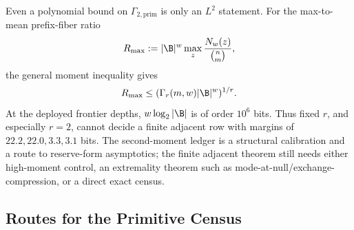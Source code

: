\begin{remark}
\label{rem:gf-sp-moment-barrier}
Even a polynomial bound on \(\Gamma_{2,\mathrm{prim}}\) is only an \(L^2\)
statement.  For the max-to-mean prefix-fiber ratio
\[
        R_{\max}:=|\B|^w\max_z \frac{N_w(z)}{\binom nm},
\]
the general moment inequality gives
\[
        R_{\max}\le (\Gamma_r(m,w)|\B|^w)^{1/r}.
\]
At the deployed frontier depths, \(w\log_2|\B|\) is of order \(10^6\) bits.
Thus fixed \(r\), and especially \(r=2\), cannot decide a finite adjacent row
with margins of \(22.2,22.0,3.3,3.1\) bits.  The second-moment ledger is a
structural calibration and a route to reserve-form asymptotics; the finite
adjacent theorem still needs either high-moment control, an extremality theorem
such as mode-at-null/exchange-compression, or a direct exact census.
\end{remark}

\subsection{Routes for the Primitive Census}

